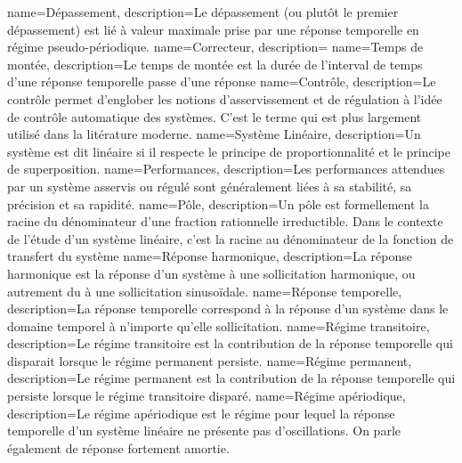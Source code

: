 %
{%
  name={Dépassement},%
  description={Le dépassement (ou plutôt le premier dépassement) 
  est lié à valeur maximale prise par une réponse temporelle en régime
  pseudo-périodique.  
  }
}
%
{%
  name={Correcteur},%
  description={
  }
}
%
{%
  name={Temps de montée},%
  description={Le temps de montée est la durée de l'interval de temps d'une 
  réponse temporelle passe d'une réponse 
  }
}
%
{%
  name={Contrôle},%
  description={Le contrôle permet d'englober les notions d'asservissement et
  de régulation à l'idée de contrôle automatique des systèmes. C'est le terme
  qui est plus largement utilisé dans la litérature moderne.  
  }
}
%
{%
  name={Système Linéaire},%
  description={Un système est dit linéaire si il respecte le principe
  de proportionnalité et le principe de superposition.
  }
}
%
{%
  name={Performances},%
  description={Les performances attendues par un système asservis ou régulé 
  sont généralement liées à sa stabilité, sa précision et sa rapidité.
  }
}
%
{%
  name={Pôle},%
  description={Un pôle est formellement la racine du dénominateur d'une
  fraction rationnelle irreductible. Dans le contexte de l'étude d'un système
  linéaire, c'est la racine au dénominateur de
  la fonction de transfert du système
  }
}
%
{%
  name={Réponse harmonique},%
  description={La réponse harmonique est la réponse d'un système à une 
  sollicitation harmonique, ou autrement du à une sollicitation sinusoïdale.
  }
}
%
{%
  name={Réponse temporelle},%
  description={La réponse temporelle correspond à la réponse d'un système 
  dans le domaine temporel à n'importe qu'elle sollicitation.
  }
}
%
{%
  name={Régime transitoire},%
  description={Le régime transitoire est la contribution de la réponse 
  temporelle qui disparait lorsque le régime permanent persiste.
  }
}
%
{%
  name={Régime permanent},%
  description={Le régime permanent est la contribution de la réponse temporelle 
  qui persiste lorsque le régime transitoire disparé.
  }
}
%
{%
  name={Régime apériodique},%
  description={Le régime apériodique est le régime pour lequel la réponse 
  temporelle d'un système linéaire ne présente pas d'oscillations. On parle
  également de réponse fortement amortie.
  }
}
